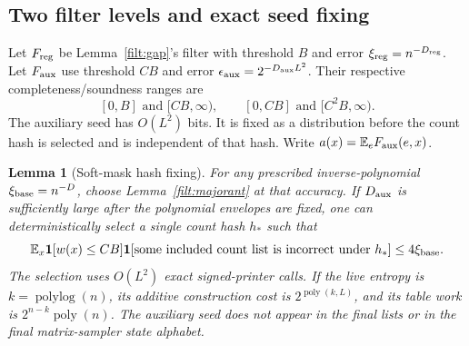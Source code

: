 \documentclass[11pt,letterpaper]{article}
\newtheorem{lemma}[theorem]{Lemma}
\theoremstyle{definition}
\theoremstyle{remark}
\begin{document}
\subsection{Two filter levels and exact seed fixing}
\label{filt:soft-subsection}

Let $F_{\rm reg}$ be Lemma~\ref{filt:gap}'s filter with threshold $B$
and error $\xi_{\rm reg}=n^{-D_{\rm reg}}$.  Let $F_{\rm aux}$ use
threshold $CB$ and error
$\epsilon_{\rm aux}=2^{-D_{\rm aux}L^2}$.
Their respective completeness/soundness ranges are
\[
 [0,B]\text{ and }[CB,\infty),\qquad
 [0,CB]\text{ and }[C^2B,\infty).
\]
The auxiliary seed has $O(L^2)$ bits.  It is fixed as a distribution
before the count hash is selected and is independent of that hash.
Write $a(x)=\mathbb E_e F_{\rm aux}(e,x)$.

\begin{lemma}[Soft-mask hash fixing]\label{filt:soft}
For any prescribed inverse-polynomial $\xi_{\rm base}=n^{-D}$,
choose Lemma~\ref{filt:majorant} at that accuracy.  If $D_{\rm aux}$
is sufficiently large after the polynomial envelopes are fixed, one
can deterministically select a single count hash $h_*$ such that
\begin{equation}\label{filt:fixed-failure}
 \mathbb E_x\mathbf1[w(x)\le CB]
 \mathbf1[\text{some included count list is incorrect under }h_*]
 \le4\xi_{\rm base}.
\end{equation}
The selection uses $O(L^2)$ exact signed-printer calls.  If the live
entropy is $k=\operatorname{polylog}(n)$, its additive construction
cost is $2^{\operatorname{poly}(k,L)}$, and its table work is
$2^{n-k}\operatorname{poly}(n)$.  The auxiliary seed does not appear
in the final lists or in the final matrix-sampler state alphabet.
\end{lemma}
\end{document}
